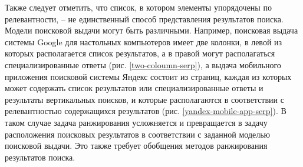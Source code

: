 \documentclass[12pt,a4paper]{report}
\newcommand\figref[1]{(рис. \ref{#1})}
\begin{document}
Также следует отметить, что список, в котором элементы упорядочены по релевантности, -- не единственный способ представления результатов поиска. Модели поисковой выдачи могут быть различными. Например, поисковая выдача системы Google для настольных компьютеров имеет две колонки, в левой из которых располагается список результатов, а в правой могут располагаться специализированные ответы \figref{two-coloumn-serp}, а выдача мобильного приложения поисковой системы Яндекс состоит из страниц, каждая из которых может содержать список результатов или специализированные ответы и результаты вертикальных поисков, и которые располагаются в соответствии с релевантностью содержащихся результатов \figref{yandex-mobile-app-serp}. В таком случае задача ранжирования усложняется и превращается в задачу расположения поисковых результатов в соответствии с заданной моделью поисковой выдачи. Это также требует обобщения методов ранжирования результатов поиска.
\end{document}

